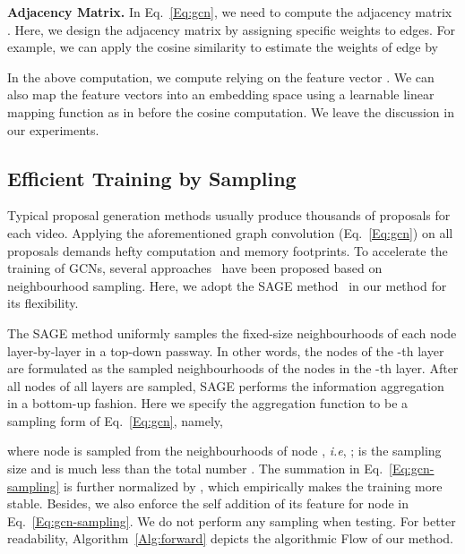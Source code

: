 \documentclass[10pt,twocolumn,letterpaper]{article}
\def\ie{\emph{i.e}\onedot} \def\Ie{\emph{I.e}\onedot}
\begin{document}
	\noindent\textbf{Adjacency Matrix.}  
In Eq.~\eqref{Eq:gcn}, we need to compute the adjacency matrix .
	Here, we design the adjacency matrix by
	assigning specific weights to edges. For example, we can apply the cosine similarity to estimate the weights of edge  by
	
	
	In the above computation, we compute  relying on the feature vector . We can also map the feature vectors 
into an embedding space using a learnable linear mapping function as in \cite{wang2018non}
	before the cosine computation. We leave the discussion in our experiments.
	


	\subsection{Efficient Training by Sampling}
	\label{Sec:training}
	
	Typical proposal generation methods usually produce thousands of proposals for each video. 
	Applying the aforementioned graph convolution (Eq.~\eqref{Eq:gcn}) on all proposals demands hefty computation and memory footprints. To accelerate the training of GCNs, several approaches~\cite{chen2018fastgcn,huang2018adaptive,hamilton2017inductive} have been proposed based on neighbourhood sampling. Here, we adopt the SAGE method~\cite{hamilton2017inductive} in our method for its flexibility. 
	
The SAGE method uniformly samples the fixed-size neighbourhoods of each node layer-by-layer in a top-down passway. In other words, the nodes of the -th layer are formulated as the sampled neighbourhoods of the nodes in the -th layer. After all nodes of all layers are sampled, SAGE performs the information aggregation in a bottom-up fashion. Here we specify the aggregation function to be a sampling form of Eq.~\eqref{Eq:gcn}, namely,
	
	where node  is sampled from the neighbourhoods of node , \ie, ;  is the sampling size and is much less than the total number . The summation in Eq.~\eqref{Eq:gcn-sampling} is further normalized by , which empirically makes the training more stable. Besides, we also enforce the self addition of its feature for node  in Eq.~\eqref{Eq:gcn-sampling}.
	We do not perform any sampling when testing. For better readability, Algorithm~\ref{Alg:forward} depicts the algorithmic Flow of our method.
	
	
	
\end{document}
